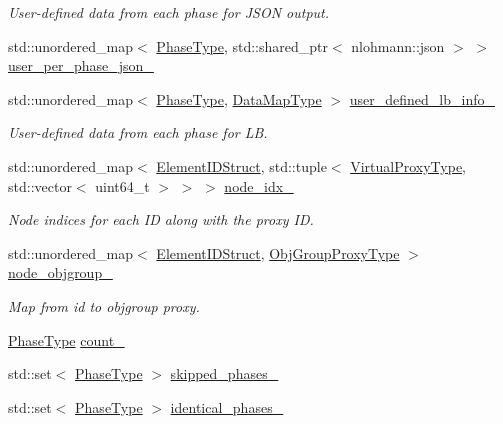 \begin{DoxyCompactItemize}
\begin{DoxyCompactList}\small\item\em User-\/defined data from each phase for J\+S\+ON output. \end{DoxyCompactList}\item 
std\+::unordered\+\_\+map$<$ \hyperlink{namespacevt_a46ce6733d5cdbd735d561b7b4029f6d7}{Phase\+Type}, std\+::shared\+\_\+ptr$<$ nlohmann\+::json $>$ $>$ \hyperlink{structvt_1_1vrt_1_1collection_1_1balance_1_1_l_b_data_holder_aa4b11a094d2f858d29e4a91d61942ddf}{user\+\_\+per\+\_\+phase\+\_\+json\+\_\+}
\item 
std\+::unordered\+\_\+map$<$ \hyperlink{namespacevt_a46ce6733d5cdbd735d561b7b4029f6d7}{Phase\+Type}, \hyperlink{namespacevt_1_1vrt_1_1collection_1_1balance_a5794b6bc763c88c78228074bd0d1a50f}{Data\+Map\+Type} $>$ \hyperlink{structvt_1_1vrt_1_1collection_1_1balance_1_1_l_b_data_holder_ad5b8a5a6093c4edd34a10069551c1d19}{user\+\_\+defined\+\_\+lb\+\_\+info\+\_\+}
\begin{DoxyCompactList}\small\item\em User-\/defined data from each phase for LB. \end{DoxyCompactList}\item 
std\+::unordered\+\_\+map$<$ \hyperlink{namespacevt_1_1vrt_1_1collection_1_1balance_a9f5b53fafb270212279a4757d2c4cd28}{Element\+I\+D\+Struct}, std\+::tuple$<$ \hyperlink{namespacevt_a1b417dd5d684f045bb58a0ede70045ac}{Virtual\+Proxy\+Type}, std\+::vector$<$ uint64\+\_\+t $>$ $>$ $>$ \hyperlink{structvt_1_1vrt_1_1collection_1_1balance_1_1_l_b_data_holder_a6b316a4e35ea98e592cbe875074aa6d8}{node\+\_\+idx\+\_\+}
\begin{DoxyCompactList}\small\item\em Node indices for each ID along with the proxy ID. \end{DoxyCompactList}\item 
std\+::unordered\+\_\+map$<$ \hyperlink{namespacevt_1_1vrt_1_1collection_1_1balance_a9f5b53fafb270212279a4757d2c4cd28}{Element\+I\+D\+Struct}, \hyperlink{namespacevt_ad7cae989df485fccca57f0792a880a8e}{Obj\+Group\+Proxy\+Type} $>$ \hyperlink{structvt_1_1vrt_1_1collection_1_1balance_1_1_l_b_data_holder_ab862d2f1b884256fc88634757f37bb80}{node\+\_\+objgroup\+\_\+}
\begin{DoxyCompactList}\small\item\em Map from id to objgroup proxy. \end{DoxyCompactList}\item 
\hyperlink{namespacevt_a46ce6733d5cdbd735d561b7b4029f6d7}{Phase\+Type} \hyperlink{structvt_1_1vrt_1_1collection_1_1balance_1_1_l_b_data_holder_ac7d4f40440b458c101af292dd3357558}{count\+\_\+}
\item 
std\+::set$<$ \hyperlink{namespacevt_a46ce6733d5cdbd735d561b7b4029f6d7}{Phase\+Type} $>$ \hyperlink{structvt_1_1vrt_1_1collection_1_1balance_1_1_l_b_data_holder_a66a5410c689d1515c9462495d3225a79}{skipped\+\_\+phases\+\_\+}
\item 
std\+::set$<$ \hyperlink{namespacevt_a46ce6733d5cdbd735d561b7b4029f6d7}{Phase\+Type} $>$ \hyperlink{structvt_1_1vrt_1_1collection_1_1balance_1_1_l_b_data_holder_a190018ee0726acb12d7d416476de5bfd}{identical\+\_\+phases\+\_\+}
\end{DoxyCompactItemize}
